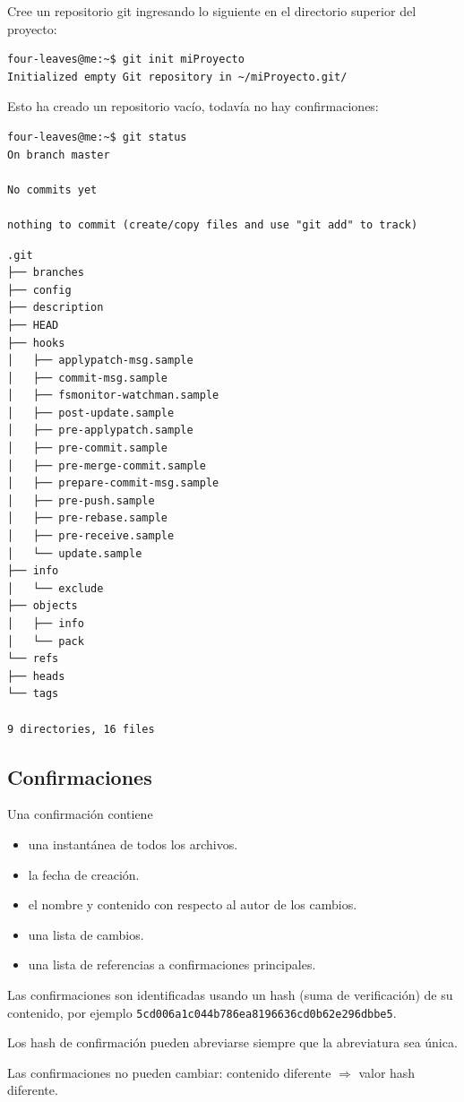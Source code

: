 Cree un repositorio git ingresando lo siguiente en el directorio superior del proyecto:
\begin{lstlisting}
four-leaves@me:~$ git init miProyecto
Initialized empty Git repository in ~/miProyecto.git/
\end{lstlisting}
Esto ha creado un repositorio vacío, todavía no hay confirmaciones:
\begin{lstlisting}
four-leaves@me:~$ git status
On branch master

No commits yet

nothing to commit (create/copy files and use "git add" to track)
\end{lstlisting}
\begin{lstlisting}
.git
├── branches
├── config
├── description
├── HEAD
├── hooks
│   ├── applypatch-msg.sample
│   ├── commit-msg.sample
│   ├── fsmonitor-watchman.sample
│   ├── post-update.sample
│   ├── pre-applypatch.sample
│   ├── pre-commit.sample
│   ├── pre-merge-commit.sample
│   ├── prepare-commit-msg.sample
│   ├── pre-push.sample
│   ├── pre-rebase.sample
│   ├── pre-receive.sample
│   └── update.sample
├── info
│   └── exclude
├── objects
│   ├── info
│   └── pack
└── refs
├── heads
└── tags

9 directories, 16 files
\end{lstlisting}

\subsection{Confirmaciones}
Una confirmación contiene
\begin{itemize}
	\item una instantánea de todos los archivos.
	\item la fecha de creación.
	\item el nombre y contenido con respecto al autor de los cambios.
	\item una lista de cambios.
	\item una lista de referencias a confirmaciones principales.
\end{itemize}
Las confirmaciones son identificadas usando un hash (suma de verificación) de su contenido, por ejemplo \lstinline|5cd006a1c044b786ea8196636cd0b62e296dbbe5|.

Los hash de confirmación pueden abreviarse siempre que la abreviatura sea única.

Las confirmaciones no pueden cambiar: contenido diferente $\Rightarrow$ valor hash diferente.

